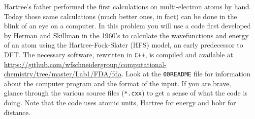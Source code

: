 \documentclass[11pt]{article}
\begin{document}
Hartree’s father performed the first calculations on multi-electron atoms by
hand. Today those same calculations (much better ones, in fact) can be done in
the blink of an eye on a computer. In this problem you will use a code first
developed by Herman and Skillman in the 1960’s to calculate the wavefunctions
and energy of an atom using the Hartree-Fock-Slater (HFS) model, an early
predecessor to DFT. The necessary software, rewritten in \texttt{C++}, is compiled and
available at
\url{https://github.com/wfschneidergroup/computational-chemistry/tree/master/Lab1/FDA/fda}. Look
at the \texttt{00README} file for information about the computer program and the
format of the input. If you are brave, glance through the various source files
(\verb~*.cxx~) to get a sense of what the code is doing. Note that the code uses
atomic units, Hartree for energy and bohr for distance.
\end{document}
